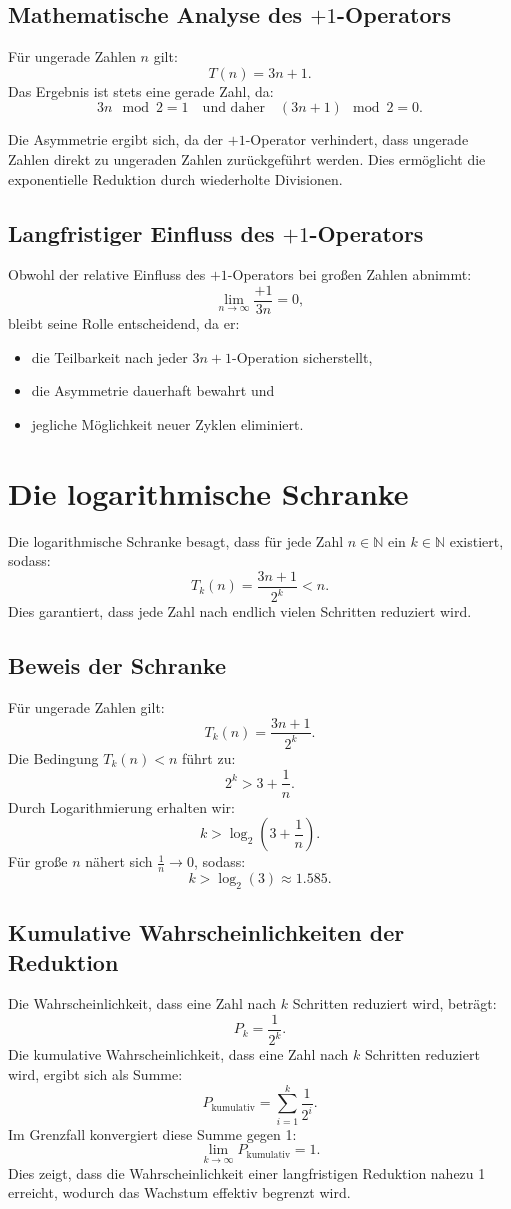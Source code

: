 \documentclass[a4paper,12pt]{article}
\begin{document}
\subsection{Mathematische Analyse des \(+1\)-Operators}
Für ungerade Zahlen \( n \) gilt:
\[
T(n) = 3n + 1.
\]
Das Ergebnis ist stets eine gerade Zahl, da:
\[
3n \mod 2 = 1 \quad \text{und daher} \quad (3n + 1) \mod 2 = 0.
\]

Die Asymmetrie ergibt sich, da der \(+1\)-Operator verhindert, dass ungerade Zahlen direkt zu ungeraden Zahlen zurückgeführt werden. Dies ermöglicht die exponentielle Reduktion durch wiederholte Divisionen.

\subsection{Langfristiger Einfluss des \(+1\)-Operators}
Obwohl der relative Einfluss des \(+1\)-Operators bei großen Zahlen abnimmt:
\[
\lim_{n \to \infty} \frac{+1}{3n} = 0,
\]
bleibt seine Rolle entscheidend, da er:
\begin{itemize}
    \item die Teilbarkeit nach jeder \( 3n+1 \)-Operation sicherstellt,
    \item die Asymmetrie dauerhaft bewahrt und
    \item jegliche Möglichkeit neuer Zyklen eliminiert.
\end{itemize}

\section{Die logarithmische Schranke}
Die logarithmische Schranke besagt, dass für jede Zahl \( n \in \mathbb{N} \) ein \( k \in \mathbb{N} \) existiert, sodass:
\[
T_k(n) = \frac{3n + 1}{2^k} < n.
\]
Dies garantiert, dass jede Zahl nach endlich vielen Schritten reduziert wird. 

\subsection{Beweis der Schranke}
Für ungerade Zahlen gilt:
\[
T_k(n) = \frac{3n + 1}{2^k}.
\]
Die Bedingung \( T_k(n) < n \) führt zu:
\[
2^k > 3 + \frac{1}{n}.
\]
Durch Logarithmierung erhalten wir:
\[
k > \log_2(3 + \frac{1}{n}).
\]
Für große \( n \) nähert sich \( \frac{1}{n} \to 0 \), sodass:
\[
k > \log_2(3) \approx 1.585.
\]

\subsection{Kumulative Wahrscheinlichkeiten der Reduktion}
Die Wahrscheinlichkeit, dass eine Zahl nach $k$ Schritten reduziert wird, beträgt:
\[
P_k = \frac{1}{2^k}.
\]
Die kumulative Wahrscheinlichkeit, dass eine Zahl nach $k$ Schritten reduziert wird, ergibt sich als Summe:
\[
P_{\text{kumulativ}} = \sum_{i=1}^k \frac{1}{2^i}.
\]
Im Grenzfall konvergiert diese Summe gegen 1:
\[
\lim_{k \to \infty} P_{\text{kumulativ}} = 1.
\]
Dies zeigt, dass die Wahrscheinlichkeit einer langfristigen Reduktion nahezu 1 erreicht, wodurch das Wachstum effektiv begrenzt wird.
\end{document}
